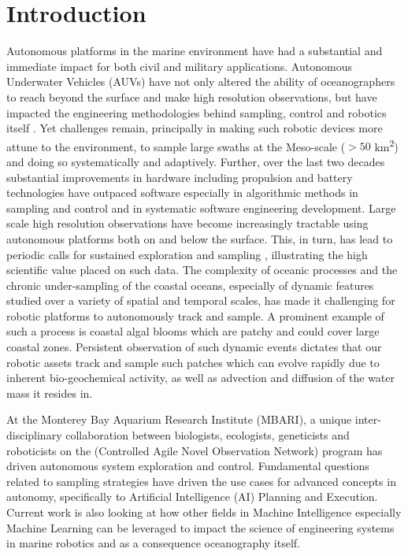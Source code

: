 \section{Introduction}
\label{sec:intro}

\setcounter{footnote}{0}


Autonomous platforms in the marine environment have had a substantial
and immediate impact for both civil and military
applications. Autonomous Underwater Vehicles (AUVs) have not only
altered the ability of oceanographers to reach beyond the surface and
make high resolution observations, but have impacted the engineering
methodologies behind sampling, control and robotics itself
\cite{Brierley08032002,ryan05,Thomas06,Yoerger01012007,Incze2009,Rigby10}. Yet
challenges remain, principally in making such robotic devices more
attune to the environment, to sample large swaths at the Meso-scale
($> 50$ km\textsuperscript{2}) and doing so systematically and
adaptively. Further, over the last two decades substantial
improvements in hardware including propulsion and battery technologies
have outpaced software especially in algorithmic methods in sampling
and control and in systematic software engineering development. Large
scale high resolution observations have become increasingly tractable
using autonomous platforms both on and below the surface.  This, in
turn, has lead to periodic calls for sustained exploration and
sampling \cite{rudnick03}, illustrating the high scientific value
placed on such data.  The complexity of oceanic processes and the
chronic under-sampling of the coastal oceans, especially of dynamic
features studied over a variety of spatial and temporal scales, has
made it challenging for robotic platforms to autonomously track and
sample. A prominent example of such a process is coastal algal blooms
which are patchy and could cover large coastal zones. Persistent
observation of such dynamic events dictates that our robotic assets
track and sample such patches which can evolve rapidly due to inherent
bio-geochemical activity, as well as advection and diffusion of the
water mass it resides in.

At the Monterey Bay Aquarium Research Institute (MBARI), a unique
inter-disciplinary collaboration between biologists, ecologists,
geneticists and roboticists on the \can (Controlled Agile Novel
Observation Network) program \cite{canon} has driven autonomous system
exploration and control. Fundamental questions related to sampling
strategies have driven the use cases for advanced concepts in
autonomy, specifically to Artificial Intelligence (AI) Planning and
Execution. Current work is also looking at how other fields in Machine
Intelligence especially Machine Learning can be leveraged to impact
the science of engineering systems in marine robotics and as a
consequence oceanography itself.


